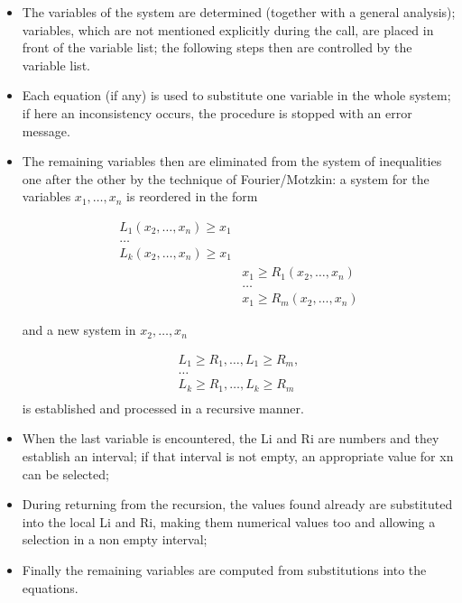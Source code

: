 \begin{itemize}
\item The variables of the system are determined (together with a general
analysis); variables, which are not mentioned explicitly during the
call, are placed in front of the variable list; the following steps
then are controlled by the variable list.

\item Each equation (if any) is used to substitute one variable in the whole
system; if here an inconsistency occurs, the procedure is stopped with
an error message.

\item The remaining variables then are eliminated from the system of
inequalities one after the other by the technique of Fourier/Motzkin:
a system for the variables ${x_1,\ldots ,x_n}$ is reordered in the form

\[\begin{array}{cc}
L_1(x_2,\ldots ,x_n) \ge x_1 & \\
\ldots & \\
L_k(x_2,\ldots ,x_n) \ge x_1 & \\
& x_1 \ge R_1(x_2,\ldots ,x_n) \\
& \ldots \\
& x_1 \ge R_m(x_2,\ldots ,x_n)
\end{array}\]

and a new system in ${x_2,\ldots ,x_n}$

\[\begin{array}{c}
L_1 \ge R_1, \ldots , L_1 \ge R_m, \\
\ldots \\
L_k \ge R_1, \ldots , L_k \ge R_m \\
\end{array}
\]
is established and processed in a recursive manner.

\item When the last variable is encountered, the Li and Ri are numbers
and they establish an interval; if that interval is not empty, an
appropriate value for xn can be selected;

\item During returning from the recursion, the values found already are
substituted into the local Li and Ri, making them numerical values
too and allowing a selection in a non empty interval;

\item Finally the remaining variables are computed from substitutions
into the equations.
\end{itemize}

